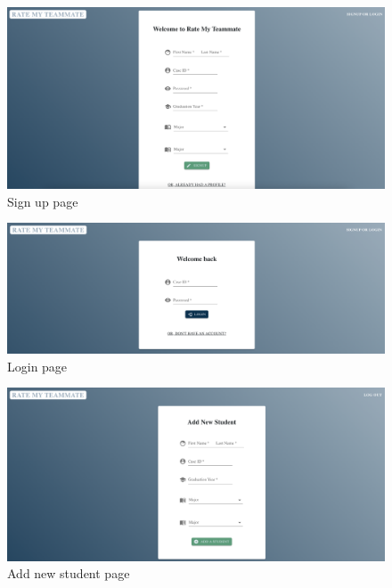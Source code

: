 \documentclass[12pt]{article}
\begin{document}
\begin{figure}[h]
    \includegraphics[scale=0.3]{signup.png}
    \caption{Sign up page}
    \label{fig:signup}
\end{figure}
\begin{figure}[h]
    \centering
    \includegraphics[scale=0.3]{login.png}
    \caption{Login page}
    \label{fig:login}
\end{figure}

\begin{figure}[h]
    \centering
    \includegraphics[scale=0.3]{addstudent.png}
    \caption{Add new student page}
    \label{fig:add}
\end{figure}
\end{document}

